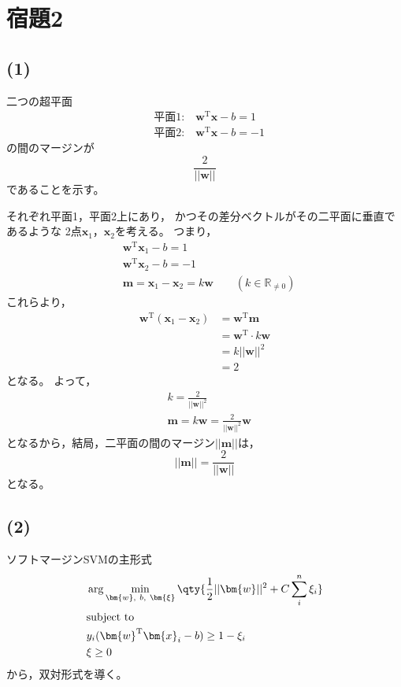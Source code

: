 \documentclass[class=jsarticle, crop=false, dvipdfmx, fleqn]{standalone}
\begin{document}
\section*{宿題2}


\subsection*{(1)}

二つの超平面
\begin{align}
	& \text{平面1:} \quad \bm{w}^\mathrm{T} \bm{x} - b = 1 \\
	& \text{平面2:} \quad \bm{w}^\mathrm{T} \bm{x} - b = -1
\end{align}
の間のマージンが
\begin{equation}
	\frac{2}{||\bm{w}||}
\end{equation}
であることを示す。

それぞれ平面1，平面2上にあり，
かつその差分ベクトルがその二平面に垂直であるような
2点\(\bm{x}_1\)，\(\bm{x}_2\)を考える。
つまり，
\begin{align}
	& \bm{w}^\mathrm{T} \bm{x}_1 - b = 1 \\
	& \bm{w}^\mathrm{T} \bm{x}_2 - b = -1 \\
	& \bm{m} = \bm{x}_1 - \bm{x}_2 = k \bm{w}
		\qquad (k \in \mathbb{R}_{\neq 0})
\end{align}
これらより，
\begin{align}
	\bm{w}^\mathrm{T} (\bm{x}_1 - \bm{x}_2)
		& = \bm{w}^\mathrm{T} \bm{m} \\
		& = \bm{w}^\mathrm{T} \cdot k \bm{w} \\
		& = k ||\bm{w}||^2 \\
		& = 2
\end{align}
となる。
よって，
\begin{align}
	& k = \frac{2}{||\bm{w}||^2} \\
	& \bm{m} = k \bm{w} = \frac{2}{||\bm{w}||^2} \bm{w}
\end{align}
となるから，結局，二平面の間のマージン\(||\bm{m}||\)は，
\begin{equation}
	||\bm{m}|| = \frac{2}{||\bm{w}||}
\end{equation}
となる。


\clearpage
\subsection*{(2)}

ソフトマージンSVMの主形式
\begin{align}
	& \arg\min_{\bm{w},\ b,\ \bm{\xi}} \qty{\frac{1}{2} ||\bm{w}||^2 + C \sum_{i}^{n} \xi_i} \\
\intertext{subject to}
	& y_i (\bm{w}^\mathrm{T} \bm{x}_i - b) \ge 1 - \xi_i \\
	& \xi \ge 0
\end{align}
から，双対形式を導く。
\end{document}
